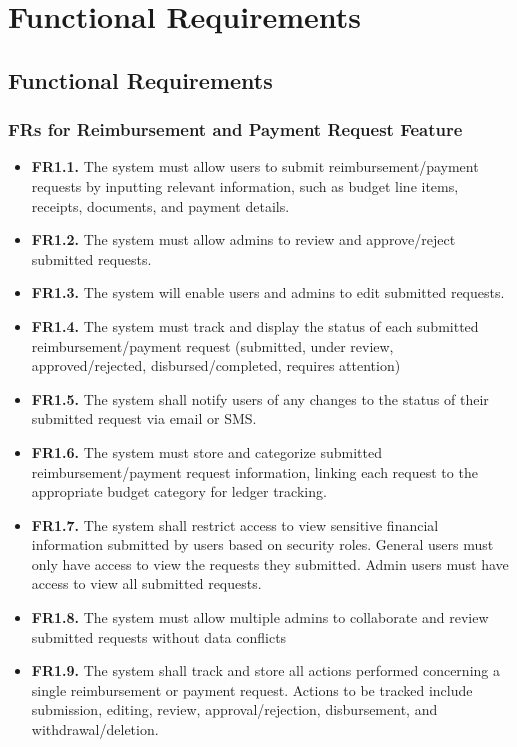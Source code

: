 \documentclass[12pt]{article}
\begin{document}
\section{Functional Requirements}
\subsection{Functional Requirements}

\subsubsection{FRs for Reimbursement and Payment Request Feature}


\begin{itemize}
    \item \hypertarget{FROneOne}{\textbf{FR1.1.} The system must allow users to submit reimbursement/payment requests by inputting relevant information, such as budget line items, receipts, documents, and payment details.}
    \item \hypertarget{FROneTwo}{\textbf{FR1.2.} The system must allow admins to review and approve/reject submitted requests.}
    \item \hypertarget{FROneThree}{ \textbf{FR1.3.} The system will enable users and admins to edit submitted requests. }
    \item \hypertarget{FROneFour}{ \textbf{FR1.4.} The system must track and display the status of each submitted reimbursement/payment request (submitted, under review, approved/rejected, disbursed/completed, requires attention) }
    \item \hypertarget{FROneFive}{ \textbf{FR1.5.} The system shall notify users of any changes to the status of their submitted request via email or SMS. }
    \item \hypertarget{FROneSix}{ \textbf{FR1.6.} The system must store and categorize submitted reimbursement/payment request information, linking each request to the appropriate budget category for ledger tracking. }
    \item \hypertarget{FROneSeven}{ \textbf{FR1.7.} The system shall restrict access to view sensitive financial information submitted by users based on security roles. General users must only have access to view the requests they submitted. Admin users must have access to view all submitted requests. }
    \item \hypertarget{FROneEight}{ \textbf{FR1.8.} The system must allow multiple admins to collaborate and review submitted requests without data conflicts }
    \item \hypertarget{FROneNine}{ \textbf{FR1.9.} The system shall track and store all actions performed concerning a single reimbursement or payment request. Actions to be tracked include submission, editing, review, approval/rejection, disbursement, and withdrawal/deletion. }
\end{itemize}
\end{document}
